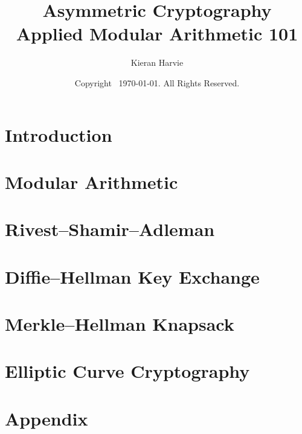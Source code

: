 \documentclass[12pt]{report}
\title{Asymmetric Cryptography \\ \large Applied Modular Arithmetic 101}
\date{Copyright \textcopyright \, \today. All Rights Reserved.}
\author{Kieran Harvie}
\begin{document}
\maketitle

\chapter{Introduction}



\chapter{Modular Arithmetic}


\chapter{Rivest–Shamir–Adleman}



\chapter{Diffie–Hellman Key Exchange}


\chapter{Merkle–Hellman Knapsack}




\chapter{Elliptic Curve Cryptography}




\renewcommand{\thechapter}{A}
\chapter{Appendix}



\end{document}
